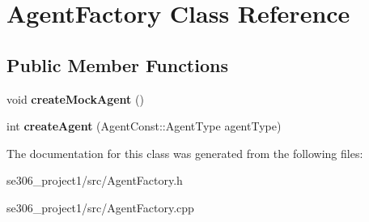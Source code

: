 \hypertarget{classAgentFactory}{\section{Agent\-Factory Class Reference}
\label{classAgentFactory}
}
\subsection*{Public Member Functions}
\begin{DoxyCompactItemize}
\item 
\hypertarget{classAgentFactory_a8785d71f067068f09326b4c5af5007b4}{void {\bfseries create\-Mock\-Agent} ()}\label{classAgentFactory_a8785d71f067068f09326b4c5af5007b4}

\item 
\hypertarget{classAgentFactory_af9d90cba73d6239705764e50feb39481}{int {\bfseries create\-Agent} (Agent\-Const\-::\-Agent\-Type agent\-Type)}\label{classAgentFactory_af9d90cba73d6239705764e50feb39481}

\end{DoxyCompactItemize}


The documentation for this class was generated from the following files\-:\begin{DoxyCompactItemize}
\item 
se306\-\_\-project1/src/Agent\-Factory.\-h\item 
se306\-\_\-project1/src/Agent\-Factory.\-cpp\end{DoxyCompactItemize}
